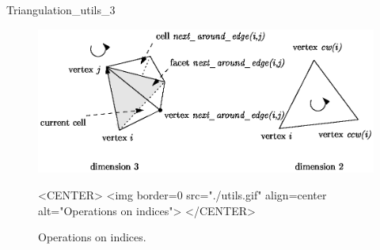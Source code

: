 \begin{ccRefClass}{Triangulation_utils_3}
\begin{figure}[htbp]
\begin{ccTexOnly}
\begin{center} 
\includegraphics{utils.eps} 
\end{center}
\end{ccTexOnly}
\caption{Operations on indices.
\label{Triangulation3-fig-utils}}
\begin{ccHtmlOnly}
<CENTER>
<img border=0 src="./utils.gif" align=center alt="Operations on indices">
</CENTER>
\end{ccHtmlOnly}
\end{figure} 





\end{ccRefClass}


